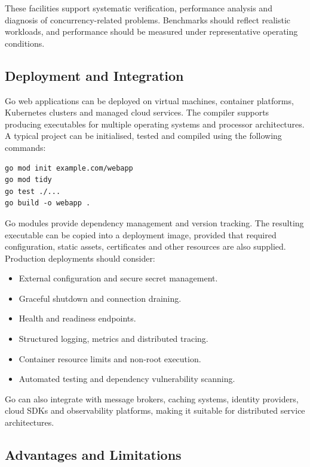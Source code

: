 These facilities support systematic verification, performance analysis and diagnosis of concurrency-related problems. Benchmarks should reflect realistic workloads, and performance should be measured under representative operating conditions.

\subsection{Deployment and Integration}

Go web applications can be deployed on virtual machines, container platforms, Kubernetes clusters and managed cloud services. The compiler supports producing executables for multiple operating systems and processor architectures.\\

A typical project can be initialised, tested and compiled using the following commands:

\begin{lstlisting}
go mod init example.com/webapp
go mod tidy
go test ./...
go build -o webapp .
\end{lstlisting}

Go modules provide dependency management and version tracking. The resulting executable can be copied into a deployment image, provided that required configuration, static assets, certificates and other resources are also supplied.\\

Production deployments should consider:

\begin{itemize}
    \item External configuration and secure secret management.
    \item Graceful shutdown and connection draining.
    \item Health and readiness endpoints.
    \item Structured logging, metrics and distributed tracing.
    \item Container resource limits and non-root execution.
    \item Automated testing and dependency vulnerability scanning.
\end{itemize}

Go can also integrate with message brokers, caching systems, identity providers, cloud SDKs and observability platforms, making it suitable for distributed service architectures.\\

\subsection{Advantages and Limitations}

